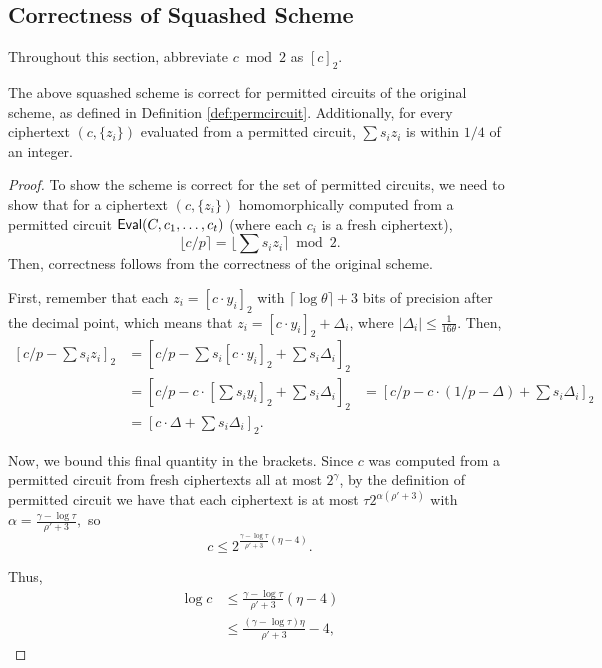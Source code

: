 \subsection{Correctness of Squashed Scheme}
Throughout this section, abbreviate $c \bmod 2$ as $[c]_2$.
\begin{lemma}
	The above squashed scheme is correct for permitted circuits of the original scheme, as defined in Definition \ref{def:permcircuit}. Additionally, for every ciphertext $(c, \{z_i\})$ evaluated from a permitted circuit, $\sum s_i z_i$ is within $1/4$ of an integer.
\end{lemma}
\begin{proof}
	To show the scheme is correct for the set of permitted circuits, we need to show that for a ciphertext $(c, \{z_i\})$ homomorphically computed from a permitted circuit ${\sf Eval}(C, c_1, \dots, c_t)$ (where each $c_i$ is a fresh ciphertext),
	\[\lfloor c/p \rceil = \lfloor \sum s_i z_i \rceil \bmod 2.\]
	Then, correctness follows from the correctness of the original scheme.

	First, remember that each $z_i = \left[c \cdot y_i \right]_2$ with $\lceil \log \theta \rceil + 3$ bits of precision after the decimal point, which means that $z_i = \left[c \cdot y_i \right]_2 + \Delta_i$, where $|\Delta_i| \leq \frac{1}{16 \theta}$.
	Then,
	\begin{align*}
		\left[ c/p - \sum s_i z_i \right]_2 &= \left[ c/p - \sum s_i \left[c \cdot y_i \right]_2 + \sum s_i \Delta_i \right]_2 \\
		&= \left[ c/p - c \cdot \left[\sum s_i y_i \right]_2 + \sum s_i \Delta_i \right]_2
		&= \left[ c/p - c \cdot (1/p - \Delta) + \sum s_i \Delta_i \right]_2 \\
		&= \left[ c \cdot \Delta + \sum s_i \Delta_i \right]_2.
	\end{align*}

	Now, we bound this final quantity in the brackets. Since $c$ was computed from a permitted circuit from fresh ciphertexts all at most $2^\gamma$, by the definition of permitted circuit we have that each ciphertext is at most $\tau 2^{\alpha (\rho' + 3)}$ with $\alpha = \frac{\gamma - \log \tau}{\rho' + 3},$ so
    \[c \leq 2^{\frac{\gamma - \log \tau}{\rho' + 3} (\eta - 4)}.\]

    Thus,
    \begin{align*}
    \log c &\leq \frac{\gamma - \log \tau}{\rho' + 3} (\eta - 4) \\
    &\leq \frac{(\gamma - \log \tau) \eta}{\rho' + 3} - 4,
    \end{align*}


\end{proof}
